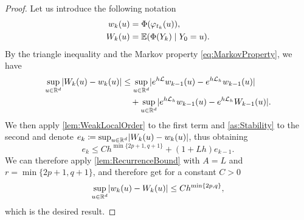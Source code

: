 \documentclass[10pt]{article}
\begin{document}
\begin{proof} Let us introduce the following notation
	\begin{equation}
		\begin{aligned}
			w_k(u) &= \Phi(\varphi_{t_k}(u)),\\
			W_k(u) &= \operatorname{\mathbb{E}}(\Phi(Y_k) \mid Y_0 = u).
		\end{aligned}
	\end{equation}
	By the triangle inequality and the Markov property \eqref{eq:MarkovProperty}, we have
	\begin{equation}
		\begin{aligned}
			\sup_{u\in\mathbb{R}^d}\lvert W_k(u) - w_k(u)\rvert &\leq \sup_{u\in\mathbb{R}^d}\lvert e^{h\mathcal{L}}w_{k-1}(u) - e^{h\mathcal{L}_h}w_{k-1}(u)\rvert \\
			&\quad + \sup_{u\in\mathbb{R}^d}\lvert e^{h\mathcal{L}_h}w_{k-1}(u) - e^{h\mathcal{L}_h}W_{k-1}(u)\rvert.
		\end{aligned}
	\end{equation}
	We then apply \cref{lem:WeakLocalOrder} to the first term and \cref{as:Stability} to the second and denote $e_k \coloneqq \sup_{u\in\mathbb{R}^d}\lvert W_k(u) - w_k(u)\rvert$, thus obtaining
	\begin{equation}
		e_k \leq Ch^{\min\{2p+1, q + 1\}} + (1 + Lh)e_{k-1}.
	\end{equation}
	We can therefore apply \cref{lem:RecurrenceBound} with $A = L$ and $r = \min\{2p+1, q + 1\}$, and therefore get for a constant $C > 0$
	\begin{equation}
		\sup_{u\in\mathbb{R}^d}\lvert w_k(u) - W_k(u)\rvert \leq Ch^{\min\{2p, q\}},
	\end{equation}
	which is the desired result.
\end{proof}
\end{document}
